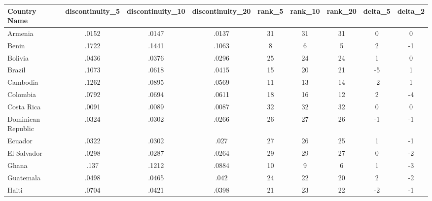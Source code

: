 {
\def\sym#1{\ifmmode^{#1}\else\(^{#1}\)\fi}
\begin{tabular}{l*{1}{cccccccc}}
\hline\hline
Country Name                  &discontinuity\_5&discontinuity\_10&discontinuity\_20&      rank\_5&     rank\_10&     rank\_20&     delta\_5&     delta\_2\\
\hline
Armenia                       &       .0152&       .0147&       .0137&          31&          31&          31&           0&           0\\
Benin                         &       .1722&       .1441&       .1063&           8&           6&           5&           2&          -1\\
Bolivia                       &       .0436&       .0376&       .0296&          25&          24&          24&           1&           0\\
Brazil                        &       .1073&       .0618&       .0415&          15&          20&          21&          -5&           1\\
Cambodia                      &       .1262&       .0895&       .0569&          11&          13&          14&          -2&           1\\
Colombia                      &       .0792&       .0694&       .0611&          18&          16&          12&           2&          -4\\
Costa Rica                    &       .0091&       .0089&       .0087&          32&          32&          32&           0&           0\\
Dominican Republic            &       .0324&       .0302&       .0266&          26&          27&          26&          -1&          -1\\
Ecuador                       &       .0322&       .0302&        .027&          27&          26&          25&           1&          -1\\
El Salvador                   &       .0298&       .0287&       .0264&          29&          29&          27&           0&          -2\\
Ghana                         &        .137&       .1212&       .0884&          10&           9&           6&           1&          -3\\
Guatemala                     &       .0498&       .0465&        .042&          24&          22&          20&           2&          -2\\
Haiti                         &       .0704&       .0421&       .0398&          21&          23&          22&          -2&          -1\\

\end{tabular}}
